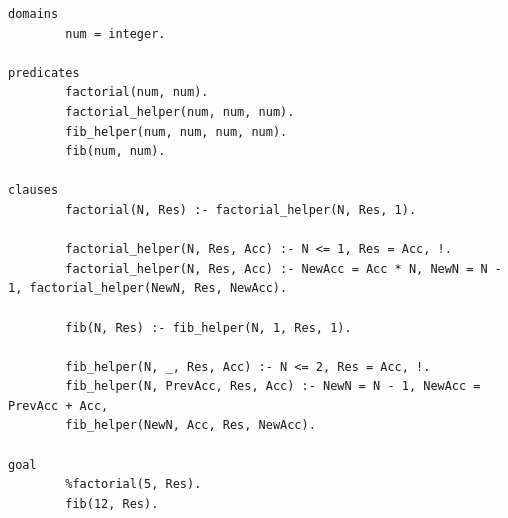 \documentclass[12pt,a4paper]{scrreprt}
\begin{document}
\begin{lstlisting}
domains
		num = integer.

predicates
		factorial(num, num).
		factorial_helper(num, num, num).
		fib_helper(num, num, num, num).
		fib(num, num).

clauses
		factorial(N, Res) :- factorial_helper(N, Res, 1).
		
		factorial_helper(N, Res, Acc) :- N <= 1, Res = Acc, !.
		factorial_helper(N, Res, Acc) :- NewAcc = Acc * N, NewN = N - 1, factorial_helper(NewN, Res, NewAcc).
		
		fib(N, Res) :- fib_helper(N, 1, Res, 1).
		
		fib_helper(N, _, Res, Acc) :- N <= 2, Res = Acc, !.
		fib_helper(N, PrevAcc, Res, Acc) :- NewN = N - 1, NewAcc = PrevAcc + Acc,
		fib_helper(NewN, Acc, Res, NewAcc).

goal
		%factorial(5, Res).
		fib(12, Res).
\end{lstlisting}
	
\end{document}
